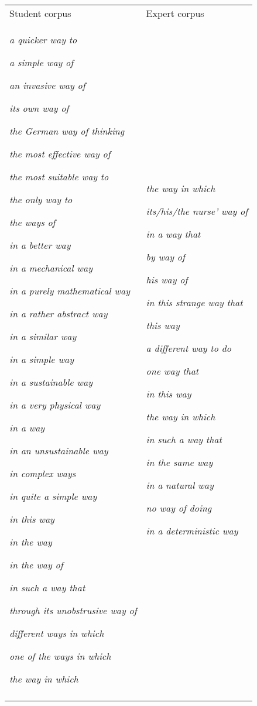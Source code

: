 \documentclass[output=paper]{langsci/langscibook}
\begin{document}
\begin{tabularx}{\textwidth}{XX}

\lsptoprule

Student corpus & Expert corpus\\
\textit{a quicker way to} 

\textit{a simple way of}

\textit{an invasive way of}

\textit{its own way of}

\textit{the German way of thinking}

\textit{the most effective way of}

\textit{the most suitable way to}

\textit{the only way to}

\textit{the ways of} 

\textit{in a better way} 

\textit{in a mechanical way}

\textit{in a purely mathematical way}

\textit{in a rather abstract way}

\textit{in a similar way}

\textit{in a simple way}

\textit{in a sustainable way}

\textit{in a very physical way}

\textit{in a way}

\textit{in an unsustainable way}

\textit{in complex ways}

\textit{in quite a simple way}

\textit{in this way}

\textit{in the way}

\textit{in the way of}

\textit{in such a way that}

\textit{through its unobstrusive way of}

\textit{different ways in which}

\textit{one of the ways in which}

\textit{the way in which} & \textit{the way in which}

\textit{its/his/the nurse’ way of} 

\textit{in a way that}

\textit{by way of}

\textit{his way of} 

\textit{in this strange way that}

\textit{this way}

\textit{a different way to do}

\textit{one way that}

\textit{in this way}

\textit{the way in which}

\textit{in such a way that}

\textit{in the same way}

\textit{in a natural way}

\textit{no way of doing}

\textit{in a deterministic way}\\
\lspbottomrule
\end{tabularx}
\end{document}
